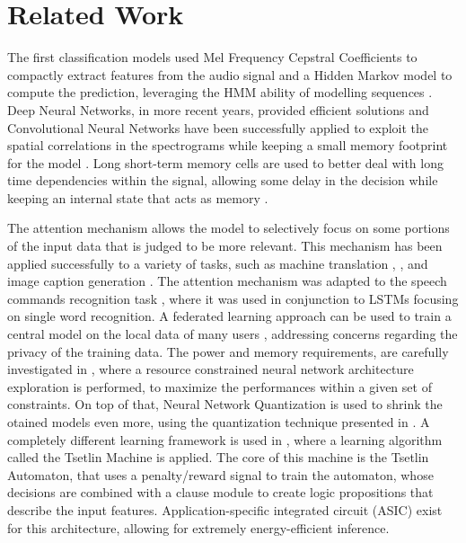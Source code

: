 
\section{Related Work}
\label{sec:related_work}

The first classification models used Mel Frequency Cepstral Coefficients to
compactly extract features from the audio signal and a Hidden Markov model to
compute the prediction, leveraging the HMM ability of modelling sequences
\cite{mfcchmm103088}.
Deep Neural Networks, in more recent years, provided efficient solutions
\cite{chensmallDNN} and Convolutional Neural Networks have been successfully
applied to exploit the spatial correlations in the spectrograms while keeping a
small memory footprint for the model \cite{sainathconvolutional}.
Long short-term memory cells are used to better deal with long time
dependencies within the signal, allowing some delay in the decision while
keeping an internal state that acts as memory \cite{fernandezRNNKWS}.

The attention mechanism allows the model to selectively focus on some portions
of the input data that is judged to be more relevant.
This mechanism has been applied successfully to a variety of tasks, such as
machine translation \cite{luong2015effective}, \cite{bahdanau2016neural}, and
image caption generation \cite{xu2016show}.
The attention mechanism was adapted to the speech commands recognition task
\cite{2018arXiv180808929C}, where it was used in conjunction to LSTMs focusing
on single word recognition.
A federated learning approach can be used to train a central model on the local
data of many users \cite{leroy2019federated}, addressing concerns regarding the
privacy of the training data.
The power and memory requirements, are carefully investigated in
\cite{zhang2018hello}, where a resource constrained neural network architecture
exploration is performed, to maximize the performances within a given set of
constraints. On top of that, Neural Network Quantization is used to shrink the
otained models even more, using the quantization technique presented in
\cite{10.1145/2847263.2847265}.
A completely different learning framework is used in \cite{granmo2021tsetlin},
where a learning algorithm called the Tsetlin Machine is applied.
The core of this machine is the Tsetlin Automaton,
that uses a penalty/reward signal to train the automaton, whose decisions are
combined with a clause module to create logic propositions that describe the 
input features.
Application-specific integrated circuit (ASIC) exist for this architecture,
allowing for extremely energy-efficient inference.
